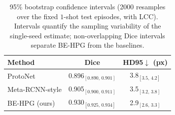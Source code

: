 \begin{table}[t]
\centering
\caption{95\% bootstrap confidence intervals (2000 resamples over the fixed $1$-shot test episodes, with LCC). Intervals quantify the sampling variability of the single-seed estimate; non-overlapping Dice intervals separate BE-HPG from the baselines.}
\label{tab:ci}
\begin{tabular}{lcc}
\toprule
Method & Dice & HD95$\downarrow$ (px) \\
\midrule
ProtoNet & 0.896$_{[0.890,\,0.901]}$ & 3.8$_{[3.5,\,4.2]}$ \\
Meta-RCNN-style & 0.905$_{[0.900,\,0.911]}$ & 3.5$_{[3.2,\,3.8]}$ \\
BE-HPG (ours) & 0.930$_{[0.925,\,0.934]}$ & 2.9$_{[2.6,\,3.3]}$ \\
\bottomrule
\end{tabular}
\end{table}
